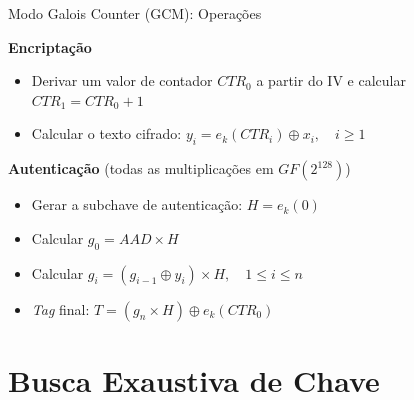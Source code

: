 \documentclass{beamer}
\begin{document}
\begin{frame}{Modo Galois Counter (GCM): Operações}

\textbf{Encriptação}
\begin{itemize}
    \small
    \item Derivar um valor de contador $CTR_0$ a partir do IV e calcular $CTR_1 = CTR_0 + 1$
    \item Calcular o texto cifrado: $y_i = e_k(CTR_i) \oplus x_i,\quad i \geq 1$
\end{itemize}

\vspace{0.8em}

\textbf{Autenticação} (todas as multiplicações em $GF(2^{128})$)
\begin{itemize}
    \small
    \item Gerar a subchave de autenticação: $H = e_k(0)$
    \item Calcular $g_0 = AAD \times H$
    \item Calcular $g_i = (g_{i-1} \oplus y_i) \times H,\quad 1 \leq i \leq n$
    \item \textit{Tag} final: $T = (g_n \times H) \oplus e_k(CTR_0)$
\end{itemize}

\end{frame}
\fi

\section{Busca Exaustiva de Chave}
\end{document}
